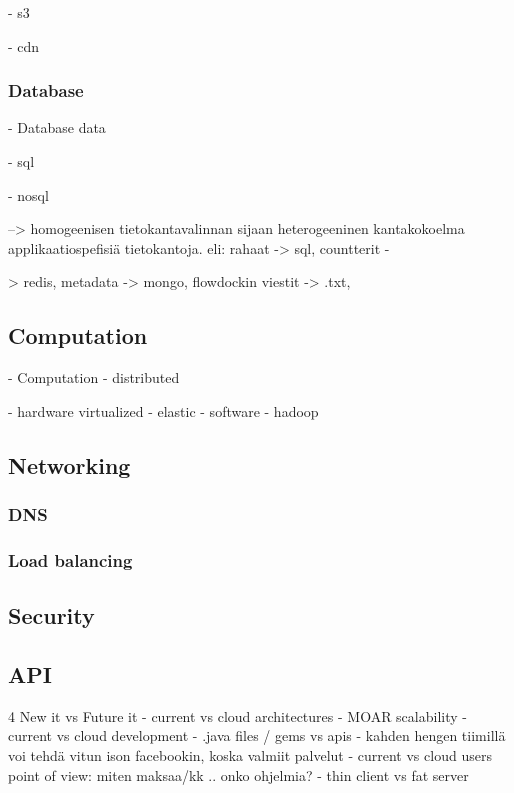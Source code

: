 \documentclass{tktltiki}
\begin{document}
- s3

- cdn

\subsubsection{Database}



- Database data

- sql

- nosql

--> homogeenisen tietokantavalinnan sijaan heterogeeninen kantakokoelma applikaatiospefisiä tietokantoja.  eli: rahaat -> sql, countterit -

> redis, metadata -> mongo, flowdockin viestit -> .txt, 

\subsection{Computation}

- Computation
- distributed

- hardware
 virtualized
- elastic
- software
- hadoop


\subsection{Networking}

\subsubsection{DNS}
\subsubsection{Load balancing}

\subsection{Security}

\subsection{API}


4 New it vs Future it
  - current vs cloud architectures
- MOAR scalability
  - current vs cloud development
- .java files / gems vs apis
- kahden hengen tiimillä voi tehdä vitun ison facebookin, koska valmiit palvelut
  - current vs cloud users point of view: miten maksaa/kk .. onko ohjelmia?
- thin client vs fat server
\end{document}
